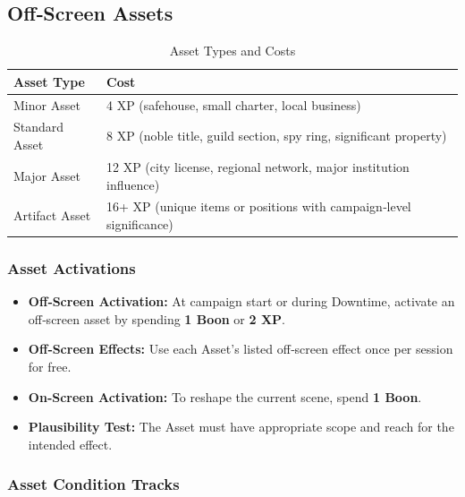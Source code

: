 \subsection{Off‑Screen Assets}\label{subsec:off_screen_assets}

\begin{longtable}{p{4cm} p{9cm}}
\caption{Asset Types and Costs}\label{tab:asset_types}\\
\toprule
\textbf{Asset Type} & \textbf{Cost} \\
\midrule
Minor Asset & 4 XP (safehouse, small charter, local business) \\
Standard Asset & 8 XP (noble title, guild section, spy ring, significant property) \\
Major Asset & 12 XP (city license, regional network, major institution influence) \\
Artifact Asset & 16+ XP (unique items or positions with campaign‑level significance) \\
\bottomrule
\end{longtable}

\subsubsection{Asset Activations}\label{subsec:asset_activations}

\begin{itemize}
    \item \textbf{Off‑Screen Activation:} At campaign start or during Downtime, activate an off‑screen asset by spending \textbf{1 Boon} or \textbf{2 XP}.
    \item \textbf{Off‑Screen Effects:} Use each Asset's listed off‑screen effect once per session for free.
    \item \textbf{On‑Screen Activation:} To reshape the current scene, spend \textbf{1 Boon}.
    \item \textbf{Plausibility Test:} The Asset must have appropriate scope and reach for the intended effect.
\end{itemize}

\subsubsection{Asset Condition Tracks}\label{subsec:asset_conditions}

